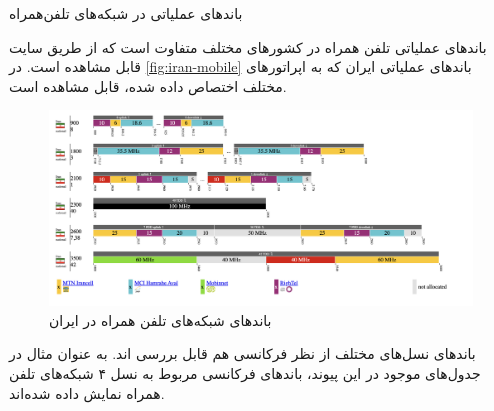 \Question
{باندهای عملیاتی در شبکه‌های تلفن‌همراه}
{
	باندهای عملیاتی تلفن همراه در کشورهای مختلف متفاوت است که از طریق سایت 
	قابل مشاهده است. در 
	\autoref{fig:iran-mobile}
	باندهای عملیاتی ایران که به اپراتورهای مختلف اختصاص داده‌ شده، قابل مشاهده است.

\begin{figure}[H]
    \includegraphics[width=1\columnwidth]{Images/Mobile-Frequencies-Iran.png}
    \centering
    \caption{باندهای شبکه‌های تلفن همراه در ایران}
    \label{fig:iran-mobile}
\end{figure}

باندهای نسل‌های مختلف از نظر فرکانسی هم قابل بررسی اند. به عنوان مثال در جدول‌های موجود در این 
پیوند، باندهای فرکانسی مربوط به نسل ۴ شبکه‌های تلفن همراه نمایش داده شده‌اند.
}